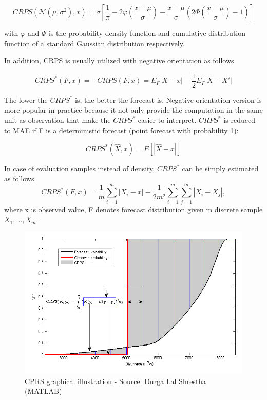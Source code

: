 \documentclass[12pt,a4paper]{article}
\numberwithin{equation}{section}
\begin{document}
 
 \[CRPS(\mathcal{N}(\mu, \sigma^2), x) = \sigma\left[\frac{1}{\pi} - 2 \varphi \left( \frac{x-\mu}{\sigma} \right) - \frac{x-\mu}{\sigma} \left( 2 \Phi \left( \frac{x-\mu}{\sigma} \right) -1 \right)\right]\]
 
 with $\varphi$ and $\Phi$ is the probability density function and cumulative distribution function of a standard Gaussian distribution respectively. 
 
In addition, CRPS is usually utilized with negative orientation as follows

\[CRPS^*(F, x) = - CRPS(F, x) = E_F |X-x| - \frac{1}{2} E_F |X-X'|\]

The lower the $CRPS^*$ is, the better the forecast is. Negative orientation version is more popular in practice because it not only provide the computation in the same unit as observation that make the $CRPS^*$ easier to interpret. $CRPS^*$ is reduced to MAE if F is a deterministic forecast (point forecast with probability 1):

\[CRPS^*(\hat{X}, x) = E[ | \hat{X} - x | ]\] 

In case of evaluation samples instead of density, $CRPS^*$ can be simply estimated as follows
\[ CRPS^*(F, x) = \frac{1}{m} \sum_{i = 1}^{m} | X_i - x | - \frac{1}{2m^2} \sum_{i = 1}^{m} \sum_{j = 1}^{m} | X_i - X_j |,\]
 where x is observed value, F denotes forecast distribution given m discrete sample $X_1, ..., X_m$.
 
\begin{figure}[h!] 
\includegraphics[scale=1,width=1\linewidth,height=0.4\textheight]{CRPS_graphical.png}
\caption{CPRS graphical illustration - Source: Durga Lal Shrestha (MATLAB)}
\label{CRPS_graph}
\end{figure}
\end{document}
